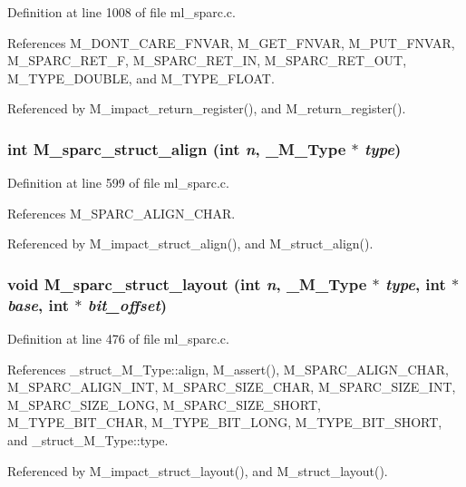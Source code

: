 Definition at line 1008 of file ml\_\-sparc.c.

References M\_\-DONT\_\-CARE\_\-FNVAR, M\_\-GET\_\-FNVAR, M\_\-PUT\_\-FNVAR, M\_\-SPARC\_\-RET\_\-F, M\_\-SPARC\_\-RET\_\-IN, M\_\-SPARC\_\-RET\_\-OUT, M\_\-TYPE\_\-DOUBLE, and M\_\-TYPE\_\-FLOAT.

Referenced by M\_\-impact\_\-return\_\-register(), and M\_\-return\_\-register().
\subsubsection{\setlength{\rightskip}{0pt plus 5cm}int M\_\-sparc\_\-struct\_\-align (int {\em n}, \bf{\_\-M\_\-Type} $\ast$ {\em type})}\label{ml__sparc_8c_c9dd4fff1abb70ca0f5e44c04bfec38b}




Definition at line 599 of file ml\_\-sparc.c.

References M\_\-SPARC\_\-ALIGN\_\-CHAR.

Referenced by M\_\-impact\_\-struct\_\-align(), and M\_\-struct\_\-align().
\subsubsection{\setlength{\rightskip}{0pt plus 5cm}void M\_\-sparc\_\-struct\_\-layout (int {\em n}, \bf{\_\-M\_\-Type} $\ast$ {\em type}, int $\ast$ {\em base}, int $\ast$ {\em bit\_\-offset})}\label{ml__sparc_8c_9ae9119fcdd7f6449761eb24d336500a}




Definition at line 476 of file ml\_\-sparc.c.

References \_\-struct\_\-M\_\-Type::align, M\_\-assert(), M\_\-SPARC\_\-ALIGN\_\-CHAR, M\_\-SPARC\_\-ALIGN\_\-INT, M\_\-SPARC\_\-SIZE\_\-CHAR, M\_\-SPARC\_\-SIZE\_\-INT, M\_\-SPARC\_\-SIZE\_\-LONG, M\_\-SPARC\_\-SIZE\_\-SHORT, M\_\-TYPE\_\-BIT\_\-CHAR, M\_\-TYPE\_\-BIT\_\-LONG, M\_\-TYPE\_\-BIT\_\-SHORT, and \_\-struct\_\-M\_\-Type::type.

Referenced by M\_\-impact\_\-struct\_\-layout(), and M\_\-struct\_\-layout().
